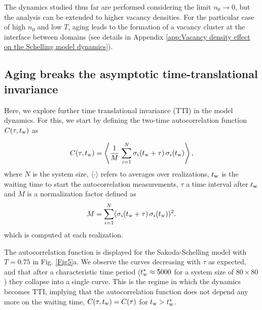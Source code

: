 The dynamics studied thus far are performed considering the limit $n_0 \to 0$, but the analysis can be extended to higher vacancy densities. For the particular case of high $n_0$ and low $T$, aging leads to the formation of a vacancy cluster at the interface between domains (see details in Appendix \ref{app:Vacancy density effect on the Schelling model dynamics}).

\subsection{Aging breaks the asymptotic time-translational invariance}

Here, we explore further time translational invariance (TTI) in the model dynamics. For this, we start by defining the two-time autocorrelation function $C(\tau,t_{\rm{w}})$ \cite{spinglassbook} as

\begin{equation}
    C(\tau,t_{\rm{w}}) = \left\langle \frac{1}{M} \, \sum_{i = 1}^{N}  \sigma_i (t_{\rm{w}} + \tau) \,  \sigma_i(t_{\rm{w}}) \right\rangle ,
\end{equation}
where $N$ is the system size,  $\langle \cdot \rangle$ refers to averages over realizations, $t_{\rm{w}}$ is the waiting time to start the autocorrelation measurements, $\tau$ a time interval after $t_{\rm{w}}$ and $M$ is a normalization factor defined as
\begin{equation}
M =  \sum_{i = 1}^{N}  (\sigma_i (t_{\rm{w}} + \tau) \, \sigma_i(t_{\rm{w}}))^2 . 
\end{equation}
which is computed at each realization. 

The autocorrelation function is displayed for the Sakoda-Schelling model with $T = 0.75$ in Fig. \ref{Fig5}a. We observe the curves decreasing with $\tau$ as expected, and that after a characteristic time period ($t_{\rm{w}}^* \approx 5000$ for a system size of $80\times 80$) they collapse into a single curve. This is the regime in which the dynamics becomes TTI, implying that the autocorrelation function does not depend any more on the waiting time, $C(\tau,t_{\rm{w}}) = C(\tau)$ for $ t_{\rm{w}} > t_{\rm{w}}^{*}$. 

